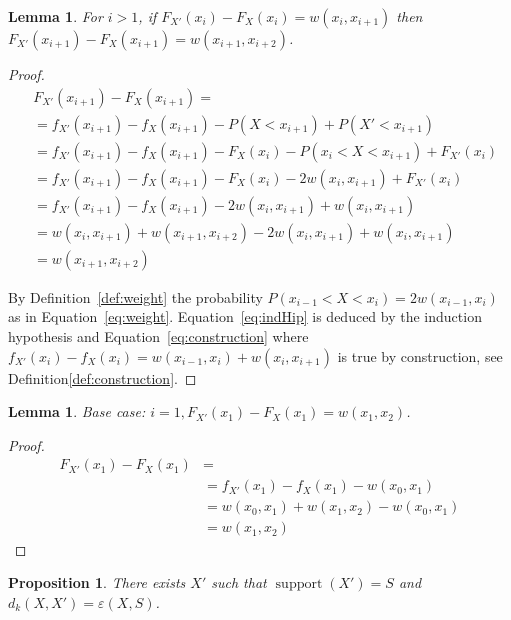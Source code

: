 \documentclass{article}
\newtheorem{lemma}[thm]{Lemma}
\newtheorem{proposition}[thm]{Proposition}
\DeclareMathOperator{\support}{support}
\begin{document}
\begin{lemma}
	For $i>1$, if $F_{X'}(x_{i})-F_{X}(x_{i}) = w(x_{i}, x_{i+1})$ then $F_{X'}(x_{i+1})-F_{X}(x_{i+1}) = w(x_{i+1}, x_{i+2})$.
\end{lemma}
\begin{proof}
	\begin{align}
	&F_{X'}(x_{i+1})-F_{X}(x_{i+1}) = \\ \nonumber
	& = f_{X'}(x_{i+1}) - f_{X}(x_{i+1}) - P(X<x_{i+1}) + P(X'<x_{i+1})  \\ \nonumber
	& = f_{X'}(x_{i+1}) - f_{X}(x_{i+1}) - F_X(x_{i}) - P(x_{i}< X < x_{i+1}) + F_{X'}(x_{i}) \\ 
	\label{eq:weight}
	& = f_{X'}(x_{i+1}) - f_{X}(x_{i+1}) - F_X(x_{i}) - 2w(x_{i},x_{i+1}) + F_{X'}(x_{i})  \\ \label{eq:indHip}
	& = f_{X'}(x_{i+1}) - f_{X}(x_{i+1}) - 2w(x_{i},x_{i+1}) +w(x_{i}, x_{i+1})  \\ \label{eq:construction}
	& = w(x_{i},x_{i+1}) +w(x_{i+1},x_{i+2}) - 2w(x_{i},x_{i+1}) +w(x_{i}, x_{i+1}) \\ \nonumber
	& = w(x_{i+1},x_{i+2}) \nonumber
	\end{align}
	
	By Definition~\ref{def:weight} the probability $P(x_{i-1}< X < x_i) = 2w(x_{i-1},x_{i})$ as in Equation~\eqref{eq:weight}. Equation~\eqref{eq:indHip} is deduced by the induction hypothesis and Equation~\eqref{eq:construction} where
	$f_{X'}(x_i) - f_{X}(x_i) = w(x_{i-1},x_i) + w(x_i,x_{i+1})$ is true by construction, see Definition\ref{def:construction}.
\end{proof}


\begin{lemma}
	Base case: $i = 1, F_{X'}(x_{1})-F_{X}(x_{1}) = w(x_{1}, x_{2})$.
\end{lemma}
\begin{proof}
	\begin{align*}
	F_{X'}(x_{1})-F_{X}(x_{1}) &= \\
	& = f_{X'}(x_{1}) - f_{X}(x_{1}) - w(x_0, x_1)  \\
	& = w(x_{0},x_1) + w(x_1,x_{2}) - w(x_0, x_1)  \\
	& = w(x_1,x_{2})
	\end{align*}
\end{proof}




\begin{proposition}
	There exists $X'$ such that $\support(X')=S$ and $d_k(X,X') = \varepsilon(X,S)$.
\end{proposition}
\end{document}

